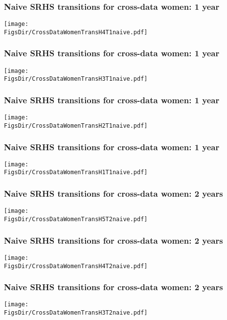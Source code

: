 \documentclass[aspectratio=169]{beamer}
\newcommand{\FigsDir}{../Figures}
\begin{document}
\begin{frame}\frametitle{Naive SRHS transitions for cross-data women: 1 year}
\begin{center}
	\texttt{[image: \\FigsDir/CrossDataWomenTransH4T1naive.pdf]}
\end{center}
\end{frame}

\begin{frame}\frametitle{Naive SRHS transitions for cross-data women: 1 year}
\begin{center}
	\texttt{[image: \\FigsDir/CrossDataWomenTransH3T1naive.pdf]}
\end{center}
\end{frame}

\begin{frame}\frametitle{Naive SRHS transitions for cross-data women: 1 year}
\begin{center}
	\texttt{[image: \\FigsDir/CrossDataWomenTransH2T1naive.pdf]}
\end{center}
\end{frame}

\begin{frame}\frametitle{Naive SRHS transitions for cross-data women: 1 year}
\begin{center}
	\texttt{[image: \\FigsDir/CrossDataWomenTransH1T1naive.pdf]}
\end{center}
\end{frame}

\begin{frame}\frametitle{Naive SRHS transitions for cross-data women: 2 years}
\begin{center}
	\texttt{[image: \\FigsDir/CrossDataWomenTransH5T2naive.pdf]}
\end{center}
\end{frame}

\begin{frame}\frametitle{Naive SRHS transitions for cross-data women: 2 years}
\begin{center}
\texttt{[image: \\FigsDir/CrossDataWomenTransH4T2naive.pdf]}
\end{center}
\end{frame}

\begin{frame}\frametitle{Naive SRHS transitions for cross-data women: 2 years}
\begin{center}
\texttt{[image: \\FigsDir/CrossDataWomenTransH3T2naive.pdf]}
\end{center}
\end{frame}
\end{document}
